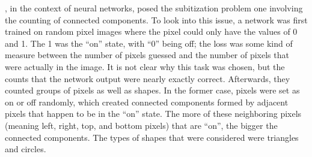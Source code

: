 \cite{guan2021understanding}, in the context of neural networks, posed the subitization problem one
involving the counting of connected components. To look into this issue, a network was first trained
on random pixel images where the pixel could only have the values of 0 and 1. The 1 was the ``on''
state, with ``0'' being off; the loss was some kind of measure between the number of pixels guessed
and the number of pixels that were actually in the image. It is not clear why this task was chosen,
but the counts that the network output were nearly exactly correct. Afterwards, they counted groups
of pixels as well as shapes. In the former case, pixels were set as on or off randomly, which
created connected components formed by adjacent pixels that happen to be in the ``on'' state. The
more of these neighboring pixels (meaning left, right, top, and bottom pixels) that are ``on'', the
bigger the connected components. The types of shapes that were considered were triangles and
circles.

